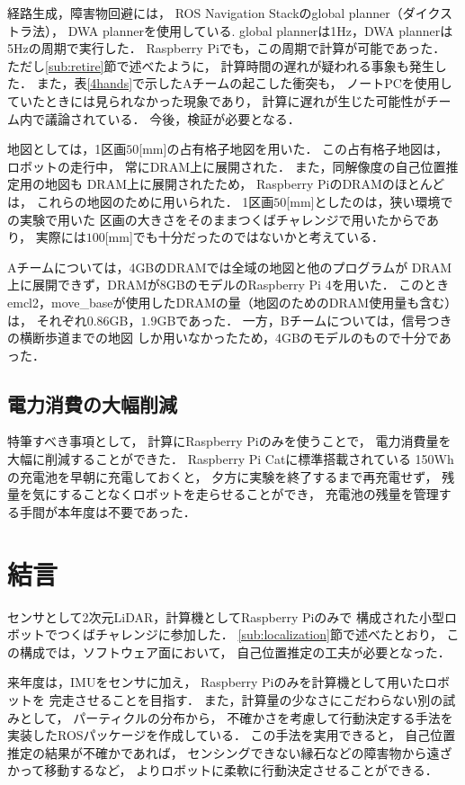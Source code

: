 \documentclass[twocolumn,9pt]{jsproceedings}
\begin{document}
経路生成，障害物回避には，
ROS Navigation Stackのglobal planner（ダイクストラ法），
DWA plannerを使用している. 
global plannerは1Hz，DWA plannerは5Hzの周期で実行した．
Raspberry Piでも，この周期で計算が可能であった．
ただし\ref{sub:retire}節で述べたように，
計算時間の遅れが疑われる事象も発生した．
また，表\ref{4hands}で示したAチームの起こした衝突も，
ノートPCを使用していたときには見られなかった現象であり，
計算に遅れが生じた可能性がチーム内で議論されている．
今後，検証が必要となる．


地図としては，1区画$50$[mm]の占有格子地図を用いた．
この占有格子地図は，ロボットの走行中，
常にDRAM上に展開された．
また，同解像度の自己位置推定用の地図も
DRAM上に展開されたため，
Raspberry PiのDRAMのほとんどは，
これらの地図のために用いられた．
1区画$50$[mm]としたのは，狭い環境での実験で用いた
区画の大きさをそのままつくばチャレンジで用いたからであり，
実際には$100$[mm]でも十分だったのではないかと考えている．

Aチームについては，4GBのDRAMでは全域の地図と他のプログラムが
DRAM上に展開できず，DRAMが8GBのモデルのRaspberry Pi 4を用いた．
このときemcl2，move\_baseが使用したDRAMの量（地図のためのDRAM使用量も含む）は，
それぞれ$0.86$GB，$1.9$GBであった．
一方，Bチームについては，信号つきの横断歩道までの地図
しか用いなかったため，4GBのモデルのもので十分であった．


\subsection{電力消費の大幅削減}

特筆すべき事項として，
計算にRaspberry Piのみを使うことで，
電力消費量を大幅に削減することができた．
Raspberry Pi Catに標準搭載されている
150Whの充電池を早朝に充電しておくと，
夕方に実験を終了するまで再充電せず，
残量を気にすることなくロボットを走らせることができ，
充電池の残量を管理する手間が本年度は不要であった．


\section{結言}

センサとして2次元LiDAR，計算機としてRaspberry Piのみで
構成された小型ロボットでつくばチャレンジに参加した．
\ref{sub:localization}節で述べたとおり，
この構成では，ソフトウェア面において，
自己位置推定の工夫が必要となった．

来年度は，IMUをセンサに加え，
Raspberry Piのみを計算機として用いたロボットを
完走させることを目指す．
また，計算量の少なさにこだわらない別の試みとして，
パーティクルの分布から，
不確かさを考慮して行動決定する手法を
実装したROSパッケージを作成している\cite{pfc}．
この手法を実用できると，
自己位置推定の結果が不確かであれば，
センシングできない縁石などの障害物から遠ざかって移動するなど，
よりロボットに柔軟に行動決定させることができる．
\end{document}
